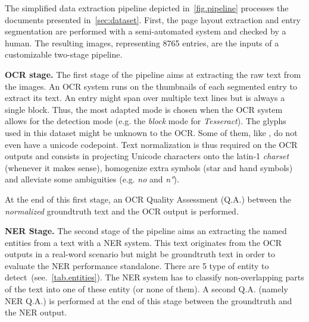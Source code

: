 
The simplified data extraction pipeline depicted in~\cref{fig.pipeline} processes the documents presented
in~\cref{sec:dataset}. First, the page layout extraction and entry segmentation are performed with a
semi-automated system and checked by a human. The resulting images, representing 8765 entries, are the inputs of a customizable two-stage pipeline.

\textbf{OCR stage.} The first stage of the pipeline aims at extracting the raw text from the images. An OCR system runs
on the thumbnails of each segmented entry to extract its text. An entry might span over multiple text lines but is
always a single block. Thus, the most adapted mode is chosen when the OCR system allows for the detection mode (e.g. the
\emph{block} mode for \emph{Tesseract}). The glyphs used in this dataset might be unknown to the OCR. Some of them, like
, do not even have a unicode codepoint. Text normalization is thus required
on the OCR outputs and consists in projecting Unicode characters onto the latin-1 \emph{charset} (whenever it makes
sense), homogenize extra symbols (star and hand symbols) and alleviate some ambiguities (e.g. \emph{no} and \emph{n°}).

At the end of this first stage, an OCR Quality Assessment (Q.A.) between the \emph{normalized} groundtruth text and the
OCR output is performed.





\textbf{NER Stage.} The second stage of the pipeline aims an extracting the named entities from a text with a NER
system. This text originates from the OCR outputs in a real-word scenario but might be groundtruth text in order to
evaluate the NER performance standalone. There are 5 type of entity to detect~(see.~\cref{tab.entities}).
The NER system has to classify non-overlapping parts of the text into one of these entity (or none of them). A second
Q.A. (namely NER Q.A.) is performed at the end of this stage between the groundtruth and the NER output.

